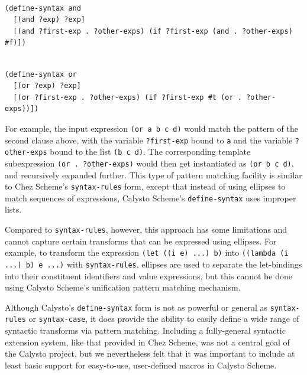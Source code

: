\documentclass[acmsmall,screen,nonacm]{acmart}
\begin{document}
\begin{minipage}{\textwidth}
\begin{verbatim}

(define-syntax and
  [(and ?exp) ?exp]
  [(and ?first-exp . ?other-exps) (if ?first-exp (and . ?other-exps) #f)])

\end{verbatim}
\end{minipage}

\begin{minipage}{\textwidth}
\begin{verbatim}

(define-syntax or
  [(or ?exp) ?exp]
  [(or ?first-exp . ?other-exps) (if ?first-exp #t (or . ?other-exps))])

\end{verbatim}
\end{minipage}

\noindent
For example, the input expression \texttt{(or a b c d)} would match the pattern
of the second clause above, with the variable \texttt{?first-exp} bound to
\texttt{a} and the variable \texttt{?other-exps} bound to the list
\texttt{(b~c~d)}. The corresponding template subexpression
\texttt{(or~.~?other-exps)} would then get instantiated as \texttt{(or~b~c~d)},
and recursively expanded further. This type of pattern matching facility is
similar to Chez Scheme's \texttt{syntax-rules} form, except that instead of
using ellipses to match sequences of expressions, Calysto Scheme's
\texttt{define-syntax} uses improper lists.

Compared to \texttt{syntax-rules}, however, this approach has some limitations
and cannot capture certain transforms that can be expressed using ellipses.
For example, to transform the expression \texttt{(let ((i e) ...) b)} into
\texttt{((lambda (i ...) b) e ...)} with \texttt{syntax-rules}, ellipses are
used to separate the let-bindings into their constituent identifiers and value
expressions, but this cannot be done using Calysto Scheme's unification pattern
matching mechanism.

Although Calysto's \texttt{define-syntax} form is not as powerful or general as
\texttt{syntax-rules} or \texttt{syntax-case}, it does provide the ability to
easily define a wide range of syntactic transforms via pattern matching.
Including a fully-general syntactic extension system, like that provided in
Chez Scheme, was not a central goal of the Calysto project, but we nevertheless
felt that it was important to include at least basic support for easy-to-use,
user-defined macros in Calysto Scheme.
\end{document}
